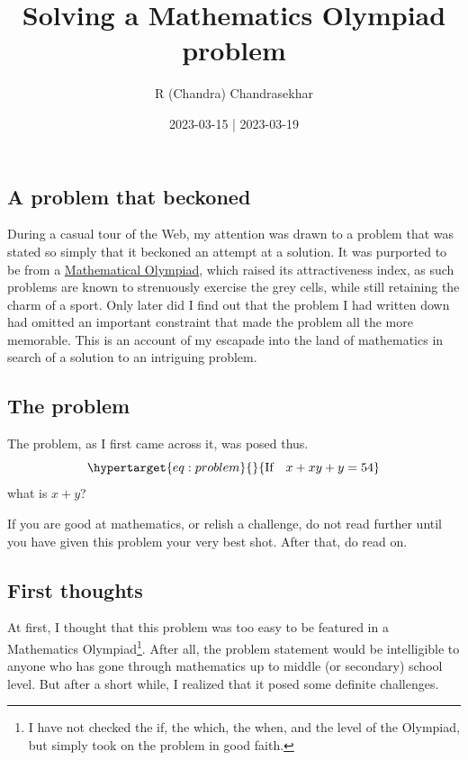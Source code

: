 \documentclass[
  a4paper,
]{article}
\title{Solving a Mathematics Olympiad problem}
\author{R (Chandra) Chandrasekhar}
\date{2023-03-15 | 2023-03-19}
\begin{document}
\maketitle

\thispagestyle{empty}


\hypertarget{a-problem-that-beckoned}{%
\subsection{A problem that beckoned}\label{a-problem-that-beckoned}}

During a casual tour of the Web, my attention was drawn to a problem
that was stated so simply that it beckoned an attempt at a solution. It
was purported to be from a
\href{https://www.imo-official.org/}{Mathematical Olympiad}, which
raised its attractiveness index, as such problems are known to
strenuously exercise the grey cells, while still retaining the charm of
a sport. Only later did I find out that the problem I had written down
had omitted an important constraint that made the problem all the more
memorable. This is an account of my escapade into the land of
mathematics in search of a solution to an intriguing problem.

\hypertarget{the-problem}{%
\subsection{The problem}\label{the-problem}}

The problem, as I first came across it, was posed thus.
\begin{equation}\protect\hypertarget{eq:problem}{}{
\text{If}\quad
x + xy + y = 54
}\label{eq:problem}\end{equation} what is \(x + y\)?

If you are good at mathematics, or relish a challenge, do not read
further until you have given this problem your very best shot. After
that, do read on.

\hypertarget{first-thoughts}{%
\subsection{First thoughts}\label{first-thoughts}}

At first, I thought that this problem was too easy to be featured in a
Mathematics Olympiad\footnote{I have not checked the if, the which, the
  when, and the level of the Olympiad, but simply took on the problem in
  good faith.}. After all, the problem statement would be intelligible
to anyone who has gone through mathematics up to middle (or secondary)
school level. But after a short while, I realized that it posed some
definite challenges.
\end{document}
